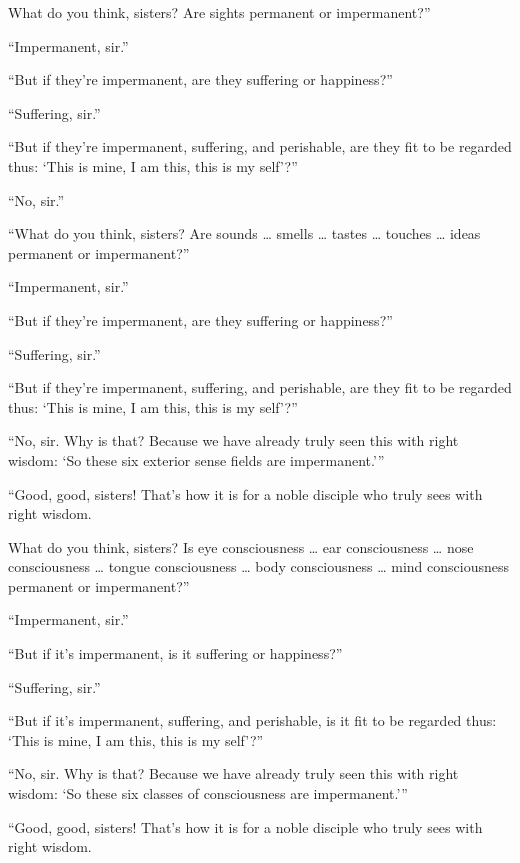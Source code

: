 \documentclass[12pt,openany]{book}%
\begin{document}
What do you think, sisters? Are sights permanent or impermanent?” 

“Impermanent, sir.” 

“But if they're impermanent, are they suffering or happiness?” 

“Suffering, sir.” 

“But if they're impermanent, suffering, and perishable, are they fit to be regarded thus: ‘This is mine, I am this, this is my self’?” 

“No, sir.” 

“What do you think, sisters? Are sounds … smells … tastes … touches … ideas permanent or impermanent?” 

“Impermanent, sir.” 

“But if they're impermanent, are they suffering or happiness?” 

“Suffering, sir.” 

“But if they're impermanent, suffering, and perishable, are they fit to be regarded thus: ‘This is mine, I am this, this is my self’?” 

“No, sir. Why is that? Because we have already truly seen this with right wisdom: ‘So these six exterior sense fields are impermanent.’” 

“Good, good, sisters! That’s how it is for a noble disciple who truly sees with right wisdom. 

What do you think, sisters? Is eye consciousness … ear consciousness … nose consciousness … tongue consciousness … body consciousness … mind consciousness permanent or impermanent?” 

“Impermanent, sir.” 

“But if it’s impermanent, is it suffering or happiness?” 

“Suffering, sir.” 

“But if it’s impermanent, suffering, and perishable, is it fit to be regarded thus: ‘This is mine, I am this, this is my self’?” 

“No, sir. Why is that? Because we have already truly seen this with right wisdom: ‘So these six classes of consciousness are impermanent.’” 

“Good, good, sisters! That’s how it is for a noble disciple who truly sees with right wisdom. 
\end{document}

